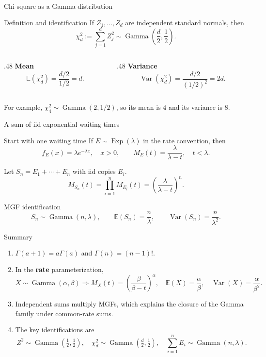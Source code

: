 \documentclass[aspectratio=169,11pt]{beamer}
\newcommand{\E}{\mathbb{E}}
\newcommand{\Var}{\operatorname{Var}}
\newcommand{\GammaDist}{\operatorname{Gamma}}
\newcommand{\Exp}{\operatorname{Exp}}
\begin{document}
\begin{frame}{Chi-square as a Gamma distribution}
  \begin{block}{Definition and identification}
    If $Z_1,\dots,Z_d$ are independent standard normals, then
    \[
      \chi^2_d:=\sum_{j=1}^{d}Z_j^2
      \sim\GammaDist\!\left(\frac d2,\frac12\right).
    \]
  \end{block}
  \begin{columns}[T]
    \begin{column}{.48\textwidth}
      \textbf{Mean}
      \[
        \E(\chi^2_d)=\frac{d/2}{1/2}=d.
      \]
    \end{column}
    \begin{column}{.48\textwidth}
      \textbf{Variance}
      \[
        \Var(\chi^2_d)=\frac{d/2}{(1/2)^2}=2d.
      \]
    \end{column}
  \end{columns}
  \vfill
  \centering\small
  For example, $\chi^2_4\sim\GammaDist(2,1/2)$, so its mean is $4$ and its variance is $8$.
\end{frame}

\begin{frame}{A sum of iid exponential waiting times}
  \begin{block}{Start with one waiting time}
    If $E\sim\Exp(\lambda)$ in the rate convention, then
    \[
      f_E(x)=\lambda e^{-\lambda x},\quad x>0,
      \qquad M_E(t)=\frac{\lambda}{\lambda-t},\quad t<\lambda.
    \]
  \end{block}
  Let $S_n=E_1+\cdots+E_n$ with iid copies $E_i$.
  \[
    M_{S_n}(t)=\prod_{i=1}^{n}M_{E_i}(t)
    =\left(\frac{\lambda}{\lambda-t}\right)^n.
  \]
  \begin{alertblock}{MGF identification}
    \[
      S_n\sim\GammaDist(n,\lambda),
      \qquad \E(S_n)=\frac{n}{\lambda},
      \qquad \Var(S_n)=\frac{n}{\lambda^2}.
    \]
  \end{alertblock}
\end{frame}

\begin{frame}{Summary}
  \begin{enumerate}
    \item $\Gamma(a+1)=a\Gamma(a)$ and $\Gamma(n)=(n-1)!$.
    \item In the \textbf{rate} parameterization,
      \[
        X\sim\GammaDist(\alpha,\beta)
        \Longrightarrow
        M_X(t)=\left(\frac{\beta}{\beta-t}\right)^\alpha,
        \quad \E(X)=\frac\alpha\beta,
        \quad \Var(X)=\frac\alpha{\beta^2}.
      \]
    \item Independent sums multiply MGFs, which explains the closure of the Gamma family under common-rate sums.
    \item The key identifications are
      \[
        Z^2\sim\GammaDist\!\left(\tfrac12,\tfrac12\right),\quad
        \chi^2_d\sim\GammaDist\!\left(\tfrac d2,\tfrac12\right),\quad
        \sum_{i=1}^n E_i\sim\GammaDist(n,\lambda).
      \]
  \end{enumerate}
\end{frame}
\end{document}

